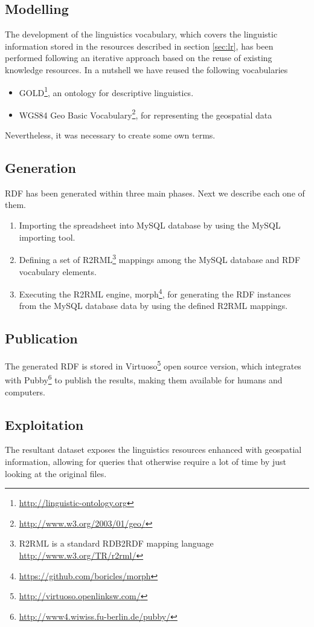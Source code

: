 \subsection{Modelling}
The development of the linguistics vocabulary, which covers the linguistic information stored in the resources described in section \ref{sec:lr}, 
has been performed following an iterative approach
based on the reuse of existing knowledge resources. In a nutshell we have reused the following vocabularies 
\begin{itemize}
	\item GOLD\footnote{\url{http://linguistic-ontology.org}}, an ontology for descriptive linguistics.
	\item WGS84 Geo Basic Vocabulary\footnote{\url{http://www.w3.org/2003/01/geo/}}, for representing the geospatial data	 
\end{itemize} 

Nevertheless, it was necessary to create some own terms.

\subsection{Generation}
RDF has been generated within three main phases. Next we describe each one of them.

\begin{enumerate}
	\item Importing the spreadsheet into MySQL database by using the MySQL importing tool.
	\item Defining a set of R2RML\footnote{R2RML is a standard RDB2RDF mapping language \url{http://www.w3.org/TR/r2rml/}} mappings among the MySQL database and RDF vocabulary elements.
	\item Executing the R2RML engine, morph\footnote{\url{https://github.com/boricles/morph}}, for generating the RDF instances from the MySQL database data by using the defined R2RML mappings.  
\end{enumerate}


\subsection{Publication}
The generated RDF is stored in Virtuoso\footnote{\url{http://virtuoso.openlinksw.com/}} open source version, which
integrates with Pubby\footnote{\url{http://www4.wiwiss.fu-berlin.de/pubby/}} to publish the results, making
them available for humans and computers.

\subsection{Exploitation}
The resultant dataset exposes the linguistics resources enhanced with geospatial information, allowing for queries that otherwise require a lot of time by just looking at the original files. 


